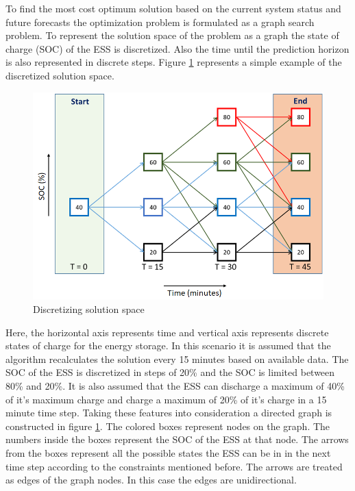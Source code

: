  To find the most cost optimum solution based on the current system status and future forecasts the optimization problem is formulated as a graph search problem. To represent the solution space of the problem as a graph the state of charge (SOC) of the ESS is discretized. Also the time until the prediction horizon is also represented in discrete steps. Figure \ref{fig:F1_Dis} represents a simple example of the discretized solution space.

\begin{figure}[!ht]
    \centering
    \includegraphics[width = \linewidth]{figs/F1_1_Dis.png}
    \caption{Discretizing solution space}
    \label{fig:F1_Dis}
\end{figure}
Here, the horizontal axis represents time and vertical axis represents discrete states of charge for the energy storage. In this scenario it is assumed that the algorithm recalculates the solution every 15 minutes based on available data. The SOC of the ESS is discretized in steps of 20\% and the SOC is limited between 80\% and 20\%. It is also assumed that the ESS can discharge a maximum of 40\% of it's maximum charge and charge a maximum of 20\% of it's charge in a 15 minute time step. Taking these features into consideration a directed graph is constructed in figure \ref{fig:F1_Dis}. The colored boxes represent nodes on the graph. The numbers inside the boxes represent the SOC of the ESS at that node. The arrows from the boxes represent all the possible states the ESS can be in in the next time step according to the constraints mentioned before. The arrows are treated as edges of the graph nodes. In this case the edges are unidirectional.

